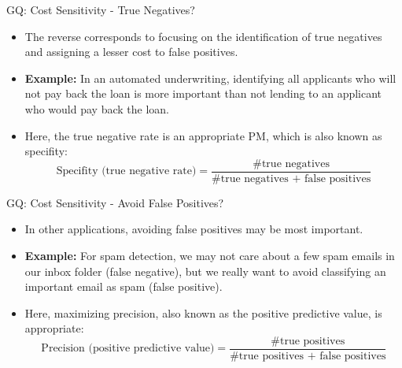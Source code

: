 \documentclass[11pt,compress,t,notes=noshow, aspectratio=169, xcolor=table]{beamer}
\begin{document}

\begin{frame}{GQ: Cost Sensitivity - True Negatives?}
    \begin{itemize}
        \item The reverse corresponds to focusing on the identification of true negatives and assigning a lesser cost to false positives.
        \item \textbf{Example:} In an automated underwriting, identifying all applicants who will not pay back the loan is more important than not lending to an applicant who would pay back the loan.
        \item Here, the true negative rate is an appropriate PM, which is also known as  specifity:
            $$
                \text{Specifity (true negative rate)} = \frac{\text{\# true negatives}}{\text{\# true negatives + false positives}}
            $$
    \end{itemize}
\end{frame}


\begin{frame}{GQ: Cost Sensitivity - Avoid False Positives?}
    \begin{itemize}
        \item In other applications, avoiding false positives may be most important.
        \item \textbf{Example:} For spam detection, we may not care about a few spam emails in our inbox folder (false negative), but we really want to avoid classifying an important email as spam (false positive).
        \item Here, maximizing precision, also known as the positive predictive value, is appropriate:
        $$
            \text{Precision (positive predictive value)} = \frac{\text{\# true positives}}{\text{\# true positives + false positives}}
        $$
    \end{itemize}
\end{frame}
\end{document}
